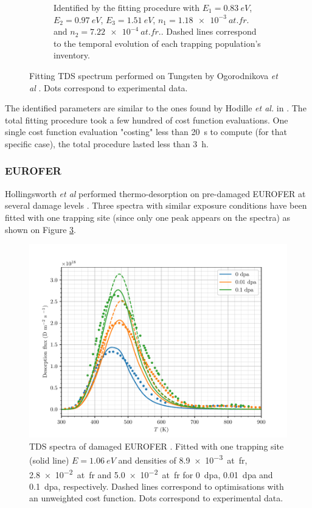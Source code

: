 \begin{figure} [h!]
\begin{subfigure}[t]{0.5\linewidth}
            \caption{Identified by the fitting procedure with $E_1 = \SI{0.83}{eV}$, $E_2 = \SI{0.97}{eV}$, $E_3 = \SI{1.51}{eV}$, $n_1 = \SI{1.18e-3}{at.fr.}$ and \newline $n_2 = \SI{7.22e-4}{at.fr.}$.  Dashed lines correspond to the temporal evolution of each trapping population's inventory.}
            \label{fig:5D TDS}
        \end{subfigure}%
    \caption{Fitting TDS spectrum performed on Tungsten by Ogorodnikova \textit{et  al} \cite{ogorodnikova_deuterium_2003}. Dots correspond to experimental data.}
    \label{fig:TDS ogorodnikova}
\end{figure}
The identified parameters are similar to the ones found by Hodille \textit{et al.} in \cite{hodille_macroscopic_2015}.
The total fitting procedure took a few hundred of cost function evaluations.
One single cost function evaluation "costing" less than \SI{20}{s} to compute (for that specific case), the total procedure lasted less than \SI{3}{h}.

\subsubsection{EUROFER}

Hollingsworth \textit{et al} performed thermo-desorption on pre-damaged EUROFER at several damage levels .
Three spectra with similar exposure conditions have been fitted with one trapping site (since only one peak appears on the spectra) as shown on Figure \ref{fig:TDS EUROFER}.

\begin{figure} [h!]
    \centering
    \includegraphics[width=0.9\linewidth]{Figures/Chapter3/Parametric_optimisation/EUROFER_hollingsworth.pdf}
    \caption{TDS spectra of damaged EUROFER \cite{hollingsworth_comparative_2019}. Fitted with one trapping site (solid line) $E=\SI{1.06}{eV}$ and densities of \SI{8.9e-3}{at.fr}, \SI{2.8e-2}{at.fr} and \SI{5.0e-2}{at.fr} for \SI{0}{dpa}, \SI{0.01}{dpa} and \SI{0.1}{dpa}, respectively. Dashed lines correspond to optimisations with an unweighted cost function. Dots correspond to experimental data.}
    \label{fig:TDS EUROFER}
\end{figure}


